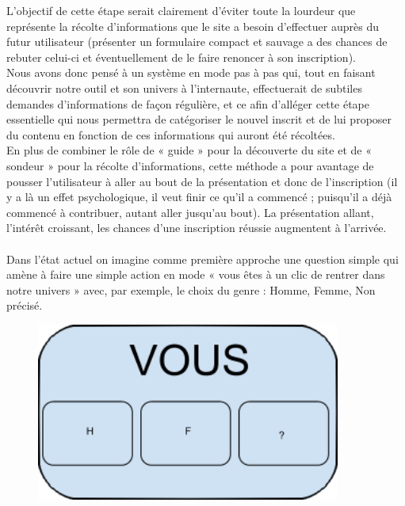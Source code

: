 \documentclass{life-fr}
\begin{document}
L'objectif de cette étape serait clairement d'éviter toute la lourdeur que représente la récolte d'informations que le site a besoin d'effectuer auprès du futur utilisateur (présenter un formulaire compact et sauvage a des chances de rebuter celui-ci et éventuellement de le faire renoncer à son inscription).\\

Nous avons donc pensé à un système en mode pas à pas qui, tout en faisant découvrir notre outil et son univers à l'internaute, effectuerait de subtiles demandes d'informations de façon régulière, et ce afin d'alléger cette étape essentielle qui nous permettra de catégoriser le nouvel inscrit et de lui proposer du contenu en fonction de ces informations qui auront été récoltées.\\

En plus de combiner le rôle de « guide » pour la découverte du site et de « sondeur » pour la récolte d'informations, cette méthode a pour avantage de pousser l'utilisateur à aller au bout de la présentation et donc de l'inscription (il y a là un effet psychologique, il veut finir ce qu'il a commencé ; puisqu'il a déjà commencé à contribuer, autant aller jusqu'au bout). La présentation allant, l'intérêt croissant, les chances d'une inscription réussie augmentent à l'arrivée.\\
\\

Dans l'état actuel on imagine comme première approche une question simple qui amène à faire une simple action en mode « vous êtes à un clic de rentrer dans notre univers » avec, par exemple, le choix du genre : Homme, Femme, Non précisé.

\begin{figure}[H]
	\begin{center}
		\includegraphics[width=10cm]{img/vous.png}
	\end{center}
\end{figure}
\end{document}
